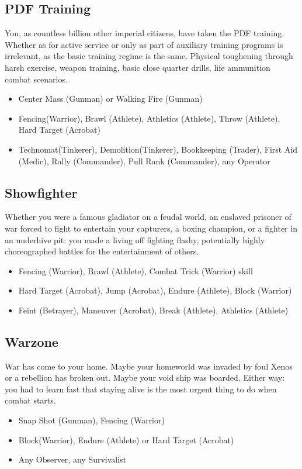 \subsection{PDF Training}
You, as countless billion other imperial citizens, have taken the PDF training. Whether as for active service or only as part of auxiliary training programs is irrelevant, as the basic training regime is the same. Physical toughening through harsh exercise, weapon training, basic close quarter drills, life ammunition combat scenarios.
\begin{itemize}
	\item Center Mass (Gunman) or Walking Fire (Gunman)
	\item Fencing(Warrior), Brawl (Athlete), Athletics (Athlete), Throw (Athlete), Hard Target (Acrobat)
	\item Technomat(Tinkerer), Demolition(Tinkerer), Bookkeeping (Trader), First Aid (Medic), Rally (Commander), Pull Rank (Commander), any Operator
\end{itemize}

\subsection{Showfighter}
Whether you were a famous gladiator on a feudal world, an enslaved prisoner of war forced to fight to entertain your capturers, a boxing champion, or a fighter in an underhive pit: you made a living off fighting flashy, potentially highly choreographed battles for the entertainment of others.
\begin{itemize}
	\item Fencing (Warrior), Brawl (Athlete), Combat Trick (Warrior) skill
	\item Hard Target (Acrobat), Jump (Acrobat), Endure (Athlete), Block (Warrior)
	\item Feint (Betrayer), Maneuver (Acrobat), Break (Athlete), Athletics (Athlete)
\end{itemize}

\subsection{Warzone}
War has come to your home. Maybe your homeworld was invaded by foul Xenos or a rebellion has broken out. Maybe your void ship was boarded. Either way: you had to learn fast that staying alive is the most urgent thing to do when combat starts.
\begin{itemize}
	\item Snap Shot (Gunman), Fencing (Warrior)
	\item Block(Warrior), Endure (Athlete) or Hard Target (Acrobat)
	\item Any Observer, any Survivalist
\end{itemize}

